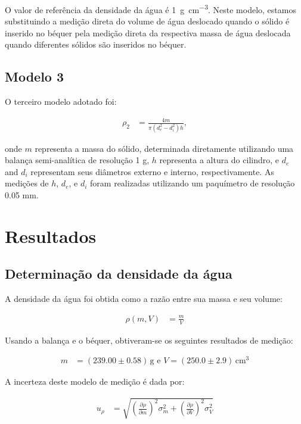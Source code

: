 \documentclass{article}
\begin{document}
\begin{multicols}{2}
O valor de referência da densidade da água é \SI{1}{\gram\per\centi\meter\cubed}. Neste modelo, estamos substituindo a medição direta do volume de água deslocado quando o sólido é inserido no béquer pela medição direta da respectiva massa de água deslocada quando diferentes sólidos são inseridos no béquer.

\subsection{Modelo 3}
O terceiro modelo adotado foi:

\begin{align}
\rho_2 &= \frac{4m}{\pi(d_e^2 - d_i^2)h},
\end{align}

onde $m$ representa a massa do sólido, determinada diretamente utilizando uma balança semi-analítica de resolução 1 g, $h$ representa a altura do cilindro, e $d_e$ and $d_i$ representam seus diâmetros externo e interno, respectivamente. As medições de $h$, $d_e$, e $d_i$ foram realizadas utilizando um paquímetro de resolução 0.05 mm.

\section{Resultados}

\subsection{Determinação da densidade da água}
A densidade da água foi obtida como a razão entre sua massa e seu volume:

\begin{align}
\rho(m, V) &= \frac{m}{V}
\end{align}

Usando a balança e o béquer, obtiveram-se os seguintes resultados de medição:

\begin{align}
m &= (239.00 \pm 0.58) \, \text{g e } V = (250.0 \pm 2.9) \, \text{cm}^3
\end{align}

A incerteza deste modelo de medição é dada por:

\begin{align}
u_{\rho} &= \sqrt{\left(\frac{\partial \rho}{\partial m}\right)^2 \sigma^2_m + \left(\frac{\partial \rho}{\partial V}\right)^2 \sigma^2_V} \\
\end{align}


\end{multicols}
\end{document}
